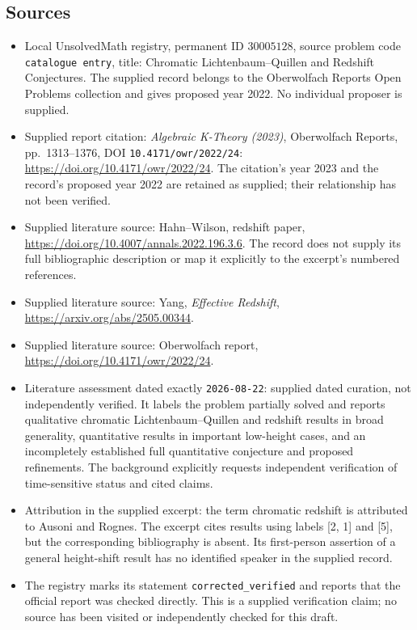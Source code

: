 \documentclass[11pt]{article}
\begin{document}
\subsection{Sources}
\begin{itemize}
\item Local UnsolvedMath registry, permanent ID \(30005128\), source problem code \texttt{catalogue entry}, title: Chromatic Lichtenbaum--Quillen and Redshift Conjectures. The supplied record belongs to the Oberwolfach Reports Open Problems collection and gives proposed year 2022. No individual proposer is supplied.
\item Supplied report citation: \emph{Algebraic K-Theory (2023)}, Oberwolfach Reports, pp.\ 1313--1376, DOI \texttt{10.4171/owr/2022/24}: \url{https://doi.org/10.4171/owr/2022/24}. The citation's year 2023 and the record's proposed year 2022 are retained as supplied; their relationship has not been verified.
\item Supplied literature source: Hahn--Wilson, redshift paper, \url{https://doi.org/10.4007/annals.2022.196.3.6}. The record does not supply its full bibliographic description or map it explicitly to the excerpt's numbered references.
\item Supplied literature source: Yang, \emph{Effective Redshift}, \url{https://arxiv.org/abs/2505.00344}.
\item Supplied literature source: Oberwolfach report, \url{https://doi.org/10.4171/owr/2022/24}.
\item Literature assessment dated exactly \texttt{2026-08-22}: supplied dated curation, not independently verified. It labels the problem partially solved and reports qualitative chromatic Lichtenbaum--Quillen and redshift results in broad generality, quantitative results in important low-height cases, and an incompletely established full quantitative conjecture and proposed refinements. The background explicitly requests independent verification of time-sensitive status and cited claims.
\item Attribution in the supplied excerpt: the term chromatic redshift is attributed to Ausoni and Rognes. The excerpt cites results using labels [2, 1] and [5], but the corresponding bibliography is absent. Its first-person assertion of a general height-shift result has no identified speaker in the supplied record.
\item The registry marks its statement \texttt{corrected\_verified} and reports that the official report was checked directly. This is a supplied verification claim; no source has been visited or independently checked for this draft.
\end{itemize}
\end{document}
